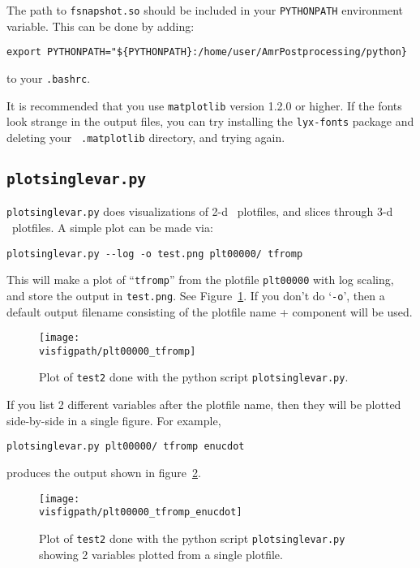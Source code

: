The path to {\tt fsnapshot.so} should be included in your {\tt PYTHONPATH}
environment variable.  This can be done by adding:
\begin{verbatim}
export PYTHONPATH="${PYTHONPATH}:/home/user/AmrPostprocessing/python}
\end{verbatim}
to your {\tt .bashrc}.

It is recommended that you use {\tt matplotlib} version 1.2.0 or
higher.  If the fonts look strange in the output files, you can try
installing the {\tt lyx-fonts} package and deleting your {\tt
  .matplotlib} directory, and trying again.

\subsection{\tt plotsinglevar.py}

{\tt plotsinglevar.py} does visualizations of 2-d \boxlib\ plotfiles,
and slices through 3-d \boxlib\ plotfiles.  A simple plot can be made
via:
\begin{verbatim}
plotsinglevar.py --log -o test.png plt00000/ tfromp
\end{verbatim}
This will make a plot of ``{\tt tfromp}'' from the plotfile {\tt plt00000} with log scaling,
and store the output in {\tt test.png}.  See Figure~\ref{fig:python}.
If you don't do `{\tt -o}', then a default output filename consisting of the
plotfile name + component will be used.

\begin{figure}[t]
\centering
\texttt{[image: \\visfigpath/plt00000\_tfromp]}
\caption[Basic plot of {\tt test2} done with {\tt plotsinglevar.py}]
{\label{fig:python} Plot of {\tt test2} done with the python
  script {\tt plotsinglevar.py}.}
\end{figure}

If you list 2 different variables after the plotfile name, then they
will be plotted side-by-side in a single figure.  For example, 
\begin{verbatim}
plotsinglevar.py plt00000/ tfromp enucdot
\end{verbatim}
produces the output shown in figure~\ref{fig:python_two}.

\begin{figure}[t]
\centering
\texttt{[image: \\visfigpath/plt00000\_tfromp\_enucdot]}
\caption[Plot of two variables from {\tt test2} done with {\tt plotsinglevar.py}]
{\label{fig:python_two} Plot of {\tt test2} done with the
  python script {\tt plotsinglevar.py} showing 2 variables plotted
  from a single plotfile.}
\end{figure}


